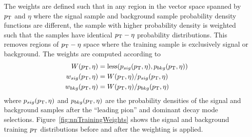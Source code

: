 The weights are defined such that in any region in the vector space spanned by
$p_{\mathrm{T}}$ and $\eta$ where the signal sample and background sample probability
density functions are different, the sample with higher probability density is
weighted such that the samples have identical $p_{\mathrm{T}}-\eta$ probability
distributions.  This removes regions of $p_{\mathrm{T}}-\eta$ space where the training
sample is exclusively signal or background.  The weights are computed according to
\begin{align*}
   W(p_{\mathrm{T}}, \eta) &=  {\rm less}(p_{sig}(p_{\mathrm{T}}, \eta), p_{bkg}(p_{\mathrm{T}}, \eta))\\
   w_{sig}(p_{\mathrm{T}}, \eta) &=  W(p_{\mathrm{T}}, \eta)/p_{sig}(p_{\mathrm{T}}, \eta) \\
   w_{bkg}(p_{\mathrm{T}}, \eta) &=  W(p_{\mathrm{T}}, \eta)/p_{bkg}(p_{\mathrm{T}}, \eta) 
\end{align*}
where $p_{sig}(p_{\mathrm{T}},\eta)$ and $p_{bkg}(p_{\mathrm{T}},\eta)$ are the probability densities of
the signal and background samples after the ``leading pion'' and dominant decay mode
selections. Figure~\ref{fig:nnTrainingWeights} shows the signal and background
training $p_{\mathrm{T}}$ distributions before and after the weighting is applied.


